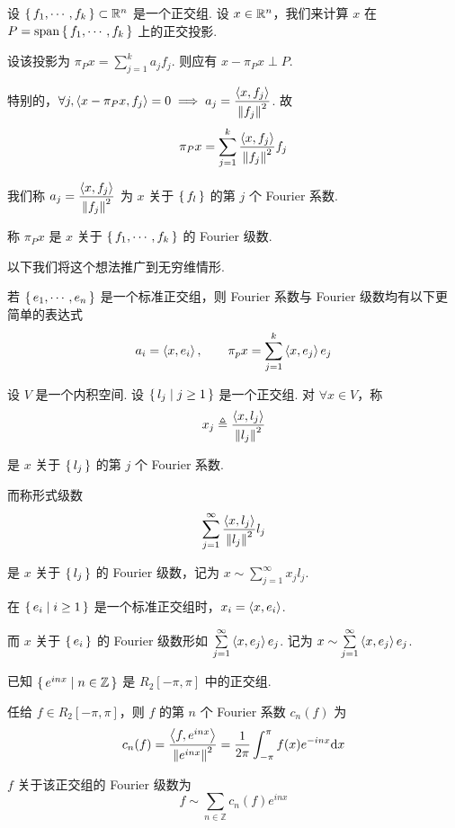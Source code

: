 
设 $\set{f_1,\cdots,f_k}\subset\mathbb{R}^n$ 是一个正交组. 设 $x\in\mathbb{R}^n$，我们来计算 $x$ 在 $P=\mathrm{span}\set{f_1,\cdots,f_k}$ 上的正交投影.

设该投影为 $\pi_Px=\sum\limits_{j=1}^ka_jf_j$. 则应有 $x-\pi_Px\perp P$.

特别的，$\forall j,\left\langle{x-\pi_Px,f_j}\right\rangle=0\implies a_j=\dfrac{\left\langle{x,f_j}\right\rangle}{\left\lVert{f_j}\right\rVert^2}$. 故
$$
\pi_Px=\sum_{j=1}^k\frac{\left\langle{x,f_j}\right\rangle}{\left\lVert{f_j}\right\rVert^2}f_j
$$

我们称 $a_j=\dfrac{\left\langle{x,f_j}\right\rangle}{\left\lVert{f_j}\right\rVert^2}$ 为 $x$ 关于 $\set{f_l}$ 的第 $j$ 个 Fourier 系数.

称 $\pi_Px$ 是 $x$ 关于 $\set{f_1,\cdots,f_k}$ 的 Fourier 级数.

以下我们将这个想法推广到无穷维情形.

\begin{hint}
    若 $\set{e_1,\cdots,e_n}$ 是一个标准正交组，则 Fourier 系数与 Fourier 级数均有以下更简单的表达式
$$
a_i=\left\langle{x,e_i}\right\rangle,\qquad\pi_px=\sum_{j=1}^k\left\langle{x,e_j}\right\rangle e_j
$$
\end{hint}

\begin{definition}
    设 $V$ 是一个内积空间. 设 $\set{l_j|j\ge 1}$ 是一个正交组. 对 $\forall x\in V$，称
$$
x_j\triangleq\frac{\left\langle{x,l_j}\right\rangle}{\left\lVert{l_j}\right\rVert^2}
$$

    是 $x$ 关于 $\set{l_j}$ 的第 $j$ 个 Fourier 系数.

    而称形式级数
$$
\sum_{j=1}^\infty\frac{\left\langle{x,l_j}\right\rangle}{\left\lVert{l_j}\right\rVert^2}l_j
$$

    是 $x$ 关于 $\set{l_j}$ 的 Fourier 级数，记为 $x\sim\sum\limits_{j=1}^\infty x_jl_j$.
\end{definition}

\begin{hint}
    在 $\set{e_i|i\ge 1}$ 是一个标准正交组时，$x_i=\left\langle{x,e_i}\right\rangle$.

    而 $x$ 关于 $\set{e_i}$ 的 Fourier 级数形如 $\sum\limits_{j=1}^\infty\left\langle{x,e_j}\right\rangle e_j$. 记为 $x\sim\sum\limits_{j=1}^\infty\left\langle{x,e_j}\right\rangle e_j$.
\end{hint}

\begin{example}
    已知 $\set{e^{inx}|n\in\mathbb{Z}}$ 是 $R_2[-\pi,\pi]$ 中的正交组.

    任给 $f\in R_2[-\pi,\pi]$，则 $f$ 的第 $n$ 个 Fourier 系数 $c_n(f)$ 为
$$
c_n(f)=\frac{\left\langle{f,e^{inx}}\right\rangle}{\left\lVert{e^{inx}}\right\rVert^2}=\frac{1}{2\pi}\int_{-\pi}^{\pi}f(x)e^{-inx}\mathrm{d} x
$$

    $f$ 关于该正交组的 Fourier 级数为
$$
f\sim\sum_{n\in\mathbb{Z}}c_n(f)e^{inx}
$$
\end{example}

